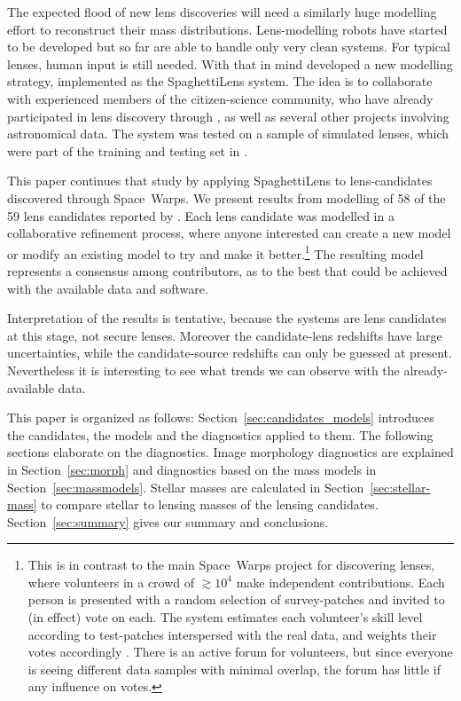 The expected flood of new lens discoveries will need a similarly huge
modelling effort to reconstruct their mass distributions.
Lens-modelling robots have started to be developed
\citep{2017arXiv170807377N,2017arXiv170808842H} but so far are able to
handle only very clean systems.  For typical lenses, human input is
still needed.  With that in mind \cite{2015MNRAS.447.2170K} developed
a new modelling strategy, implemented as the SpaghettiLens system.
The idea is to collaborate with experienced members of the
citizen-science community, who have already participated in lens
discovery through \SW, as well as several other projects involving
astronomical data.  The system was tested on a sample of simulated
lenses, which were part of the training and testing set in \SW.

This paper continues that study by applying SpaghettiLens to
lens-candidates discovered through Space~Warps.  We present results
from modelling of 58 of the 59 lens candidates reported by
\cite{2016MNRAS.455.1191M}.  Each lens candidate was modelled in a
collaborative refinement process, where anyone interested can create a
new model or modify an existing model to try and make it
better.\footnote{This is in contrast to the main Space~Warps project
  for discovering lenses, where volunteers in a crowd of $\gtrsim10^4$
  make independent contributions.  Each person is presented with a
  random selection of survey-patches and invited to (in effect) vote
  on each.  The system estimates each volunteer's skill level
  according to test-patches interspersed with the real data, and
  weights their votes accordingly \citep{2016MNRAS.455.1171M}.  There
  is an active forum for volunteers, but since everyone is seeing
  different data samples with minimal overlap, the forum has little if
  any influence on votes.}  The resulting model represents a consensus
among contributors, as to the best that could be achieved with the
available data and software.

Interpretation of the results is tentative,
because the systems are lens candidates at this stage, not secure lenses.
Moreover the candidate-lens redshifts have large uncertainties, while
the candidate-source redshifts can only be guessed at present.
Nevertheless it is interesting to see what trends we can observe with
the already-available data.

This paper is organized as follows:
Section~\ref{sec:candidates_models} introduces the candidates, the models and the diagnostics applied to them.
The following sections elaborate on the diagnostics.
Image morphology diagnostics are explained in Section~\ref{sec:morph} and
diagnostics based on the mass models in Section~\ref{sec:massmodels}.
Stellar masses are calculated in Section~\ref{sec:stellar-mass} to compare stellar to lensing masses of the lensing candidates.
Section~\ref{sec:summary} gives our summary and conclusions.

